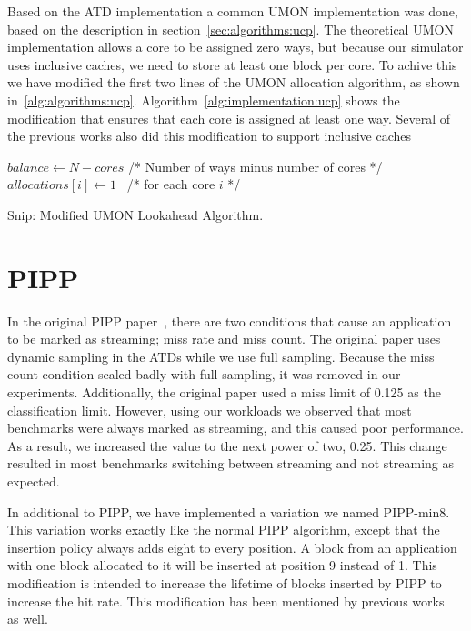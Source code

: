 Based on the ATD implementation a common UMON implementation was done, based on the description in section~\ref{sec:algorithms:ucp}.
The theoretical UMON implementation allows a core to be assigned zero ways, but because our simulator uses inclusive caches, we need to store at least one block per core.
To achive this we have modified the first two lines of the UMON allocation algorithm, as shown in~\ref{alg:algorithms:ucp}.
Algorithm~\ref{alg:implementation:ucp} shows the modification that ensures that each core is assigned at least one way.
Several of the previous works also did this modification to support inclusive caches~\cite{Qureshi2006,Xie2009}

\begin{algorithm}[ht]
\begin{algorithmic}[1]
\State $balance\gets N - cores $ /* Number of ways minus number of cores */
\State $allocations[i]\gets 1$  /* for each core $i$ */
\end{algorithmic}
\caption{Snip: Modified UMON Lookahead Algorithm.}
\label{alg:implementation:ucp}
\end{algorithm}

\section{PIPP}

In the original PIPP paper~\cite{Xie2009}, there are two conditions that cause an application to be marked as streaming; miss rate and miss count.
The original paper uses dynamic sampling in the ATDs while we use full sampling.
Because the miss count condition scaled badly with full sampling, it was removed in our experiments.
Additionally, the original paper used a miss limit of 0.125 as the classification limit.
However, using our workloads we observed that most benchmarks were always marked as streaming, and this caused poor performance.
As a result, we increased the value to the next power of two, 0.25.
This change resulted in most benchmarks switching between streaming and not streaming as expected.

In additional to PIPP, we have implemented a variation we named PIPP-min8.
This variation works exactly like the normal PIPP algorithm, except that the insertion policy always adds eight to every position.
A block from an application with one block allocated to it will be inserted at position 9 instead of 1.
This modification is intended to increase the lifetime of blocks inserted by PIPP to increase the hit rate.
This modification has been mentioned by previous works~\cite{Manikantan2012} as well.

